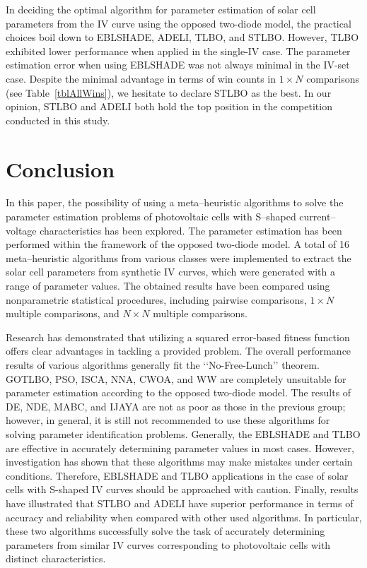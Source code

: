 \documentclass[a4paper,fleqn]{cas-dc}
\begin{document}
In deciding the optimal algorithm for parameter estimation of solar cell parameters 
from the IV curve using the opposed two-diode model, 
the practical choices boil down to EBLSHADE, ADELI, TLBO, and STLBO.
However, TLBO exhibited lower performance when applied in the single-IV case.
The parameter estimation error when using EBLSHADE was not always minimal in the IV-set case.
Despite the minimal advantage in terms of win counts in $1\times N$ comparisons
(see Table~\ref{tblAllWins}),
we hesitate to declare STLBO as the best.
In our opinion, STLBO and ADELI both hold the top position in the competition conducted in this study.





\section{Conclusion}

In this paper, the possibility of using a meta--heuristic algorithms 
to solve the parameter estimation problems of photovoltaic cells 
with S--shaped current--voltage characteristics has been explored.
The parameter estimation has been performed within the framework of the opposed two-diode model.
A total of 16 meta--heuristic algorithms from various classes were implemented 
to extract the solar cell parameters from synthetic IV curves, which were generated with a range of parameter values.
The obtained results have been compared using nonparametric statistical procedures, 
including pairwise comparisons, $1\times N$ multiple comparisons, and $N\times N$ multiple comparisons.

Research has demonstrated that utilizing a squared error-based fitness function offers clear advantages in tackling a provided problem.
The overall performance results of various algorithms generally fit the ‘‘No-Free-Lunch’’ theorem.
GOTLBO, PSO, ISCA, NNA, CWOA, and WW are completely unsuitable for parameter estimation according to the opposed two-diode model.
The results of DE, NDE, MABC, and IJAYA are not as poor as those in the previous group; 
however, in general, it is still not recommended to use these algorithms for solving parameter identification problems.
Generally, the EBLSHADE and TLBO are effective in accurately determining parameter values in most cases.
However, investigation has shown that these algorithms may make mistakes under certain conditions.
Therefore, EBLSHADE and TLBO applications in the case of solar cells with S-shaped IV curves should be approached with caution.
Finally, results have illustrated that STLBO and ADELI have superior performance in terms of accuracy and reliability 
when compared with other used algorithms.
In particular, these two algorithms successfully solve the task of accurately determining parameters 
from similar IV curves corresponding to photovoltaic cells with distinct characteristics.
\end{document}
